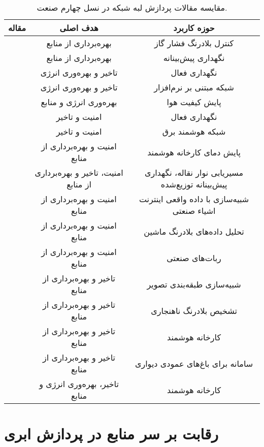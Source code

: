 \begin{table}[t]
\center
\caption{مقایسه مقالات پردازش لبه شبکه در نسل چهارم صنعت.}
\begin{tabular}{|c|c|c|}
\hline
مقاله & هدف اصلی & حوزه کاربرد\\
\hline
\hline
\cite{vakili2019open} & بهره‌برداری از منابع & کنترل بلادرنگ فشار گاز\\ 
\cite{oyekanlu2017predictive} & بهره‌برداری از منابع & نگهداری پیش‌بینانه \\
\cite{chalapathi2021iioT} & تاخیر و بهره‌وری انرژی & نگهداری فعال \\
\cite{kaur2018edge} & تاخیر و بهره‌وری انرژی & شبکه مبتنی بر نرم‌افزار \\
\cite{kristiani2021cloudedge} & بهره‌وری انرژی و منابع & پایش کیفیت هوا\\
\cite{chen2018edge} & امنیت و تاخیر & نگهداری فعال \\
\cite{okay2016fog} & امنیت و تاخیر & شبکه هوشمند برق\\
\cite{fu2018secure} & امنیت و بهره‌برداری از منابع & پایش دمای کارخانه هوشمند\\
\cite{pop2021fora} & امنیت، تاخیر و بهره‌برداری از منابع & مسیریابی نوار نقاله، نگهداری پیش‌بینانه توزیع‌شده\\
\cite{chekired2018industrial} & امنیت و بهره‌برداری از منابع & شبیه‌سازی با داده واقعی اینترنت اشیاء صنعتی\\
\cite{denzler2020consolidating} & امنیت و بهره‌برداری از منابع & تحلیل داده‌های بلادرنگ ماشین\\
\cite{shaik2020fog} & امنیت و بهره‌برداری از منابع & ربات‌های صنعتی\\
\cite{liang2020edge} & تاخیر و بهره‌برداری از منابع & شبیه‌سازی طبقه‌بندی تصویر\\
\cite{Ferrari2019Anomaly} & تاخیر و بهره‌برداری از منابع & تشخیص بلادرنگ ناهنجاری\\
\cite{Lee2020SmartMfg} & تاخیر و بهره‌برداری از منابع & کارخانه هوشمند\\
\cite{liu2021performance} & تاخیر و بهره‌برداری از منابع & سامانه برای باغ‌های عمودی دیواری\\
\cite{li2018adaptive} & تاخیر، بهره‌وری انرژی و منابع & کارخانه هوشمند\\
\hline
\end{tabular}
\label{table:litr_rev_industry}
\end{table}

\section{رقابت بر سر منابع در پردازش ابری}

